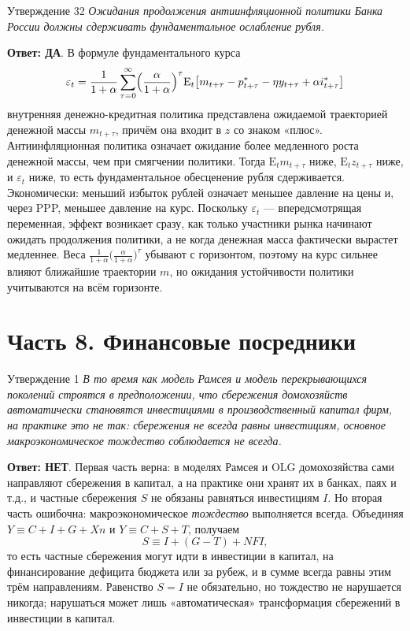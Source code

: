 \documentclass[10pt,a4paper]{article}
\newcommand{\qda}{\textbf{\color{yesgreen}Ответ: ДА}}
\newcommand{\qnet}{\textbf{\color{nored}Ответ: НЕТ}}
\newenvironment{answer}[2]{%
  \begin{qbox}{Утверждение #1}
  \textit{#2}\par\smallskip
}{%
  \end{qbox}\vspace{2pt}
}
\begin{document}
\begin{answer}{32}{Ожидания продолжения антиинфляционной политики Банка России должны сдерживать фундаментальное ослабление рубля.}
\qda. В формуле фундаментального курса
\[
\varepsilon_t=\dfrac{1}{1+\alpha}\sum_{\tau=0}^{\infty}\Bigl(\dfrac{\alpha}{1+\alpha}\Bigr)^{\tau}\mathrm{E}_t\bigl[m_{t+\tau}-p^*_{t+\tau}-\eta y_{t+\tau}+\alpha i^*_{t+\tau}\bigr]
\]
внутренняя денежно-кредитная политика представлена ожидаемой траекторией денежной массы $m_{t+\tau}$, причём она входит в $z$ со знаком «плюс». Антиинфляционная политика означает ожидание более медленного роста денежной массы, чем при смягчении политики. Тогда $\mathrm{E}_tm_{t+\tau}$ ниже, $\mathrm{E}_tz_{t+\tau}$ ниже, и $\varepsilon_t$ ниже, то есть фундаментальное обесценение рубля сдерживается. Экономически: меньший избыток рублей означает меньшее давление на цены и, через PPP, меньшее давление на курс. Поскольку $\varepsilon_t$ --- впередсмотрящая переменная, эффект возникает сразу, как только участники рынка начинают ожидать продолжения политики, а не когда денежная масса фактически вырастет медленнее. Веса $\frac{1}{1+\alpha}\bigl(\frac{\alpha}{1+\alpha}\bigr)^\tau$ убывают с горизонтом, поэтому на курс сильнее влияют ближайшие траектории $m$, но ожидания устойчивости политики учитываются на всём горизонте.
\end{answer}

\newpage
\section{Часть 8. Финансовые посредники}

\begin{answer}{1}{В то время как модель Рамсея и модель перекрывающихся поколений строятся в предположении, что сбережения домохозяйств автоматически становятся инвестициями в производственный капитал фирм, на практике это не так: сбережения не всегда равны инвестициям, основное макроэкономическое тождество соблюдается не всегда.}
\qnet. Первая часть верна: в моделях Рамсея и OLG домохозяйства сами направляют сбережения в капитал, а на практике они хранят их в банках, паях и т.д., и частные сбережения $S$ не обязаны равняться инвестициям $I$. Но вторая часть ошибочна: макроэкономическое \emph{тождество} выполняется всегда. Объединяя $Y\equiv C+I+G+Xn$ и $Y\equiv C+S+T$, получаем
\[
S\equiv I+(G-T)+NFI,
\]
то есть частные сбережения могут идти в инвестиции в капитал, на финансирование дефицита бюджета или за рубеж, и в сумме всегда равны этим трём направлениям. Равенство $S=I$ не обязательно, но тождество не нарушается никогда; нарушаться может лишь «автоматическая» трансформация сбережений в инвестиции в капитал.
\end{answer}
\end{document}
